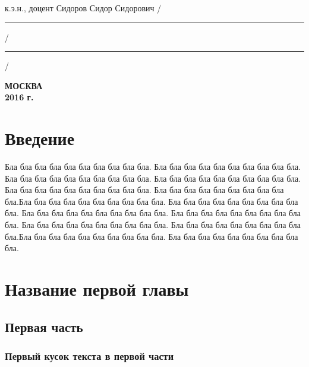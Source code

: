 \documentclass[12pt,a4paper, oneside]{report}
\begin{document}
{\begin{titlepage}
\noindent
к.э.н., доцент Сидоров Сидор Сидорович
\hfill /\rule{6em}{0.5pt}/\rule{6em}{0.5pt}/

\hfill{}

%
%

\vfill

\begin{center}
\normalsize \bfseries МОСКВА \\ 2016 г.
\end{center}
\normalsize
\end{titlepage}
}

\newpage

\tableofcontents


\chapter*{Введение}

Бла бла бла бла бла бла бла бла бла бла. Бла бла бла бла бла бла бла бла бла бла. Бла бла бла бла бла бла бла бла бла бла. Бла бла бла бла бла бла бла бла бла бла. Бла бла бла бла бла бла бла бла бла бла. Бла бла бла бла бла бла бла бла бла бла.Бла бла бла бла бла бла бла бла бла бла. Бла бла бла бла бла бла бла бла бла бла. Бла бла бла бла бла бла бла бла бла бла. Бла бла бла бла бла бла бла бла бла бла. Бла бла бла бла бла бла бла бла бла бла. Бла бла бла бла бла бла бла бла бла бла.Бла бла бла бла бла бла бла бла бла бла. Бла бла бла бла бла бла бла бла бла бла.


\chapter{Название первой главы}


\section{Первая часть}
\subsection{Первый кусок текста в первой части}
\end{document}
